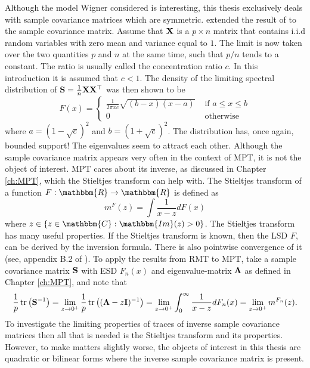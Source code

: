 \documentclass[12pt, twoside]{book}\usepackage{knitr}
\begin{document}
Although the model Wigner considered is interesting, this thesis exclusively deals with sample covariance matrices which are symmetric.
\citet{marchenko1967distribution} extended the result of \citet{wigner1967random} to the sample covariance matrix.
Assume that $\mathbf{X}$ is a $p \times n$ matrix that contains i.i.d random variables with zero mean and variance equal to $1$.
The limit is now taken over the two quantities $p$ and $n$ at the same time, such that $p/n$ tends to a constant.
The ratio is usually called the concentration ratio $c$.
In this introduction it is assumed that $c<1$.
The density of the limiting spectral distribution of $\mathbf{S}=\frac{1}{n} \mathbf{X} \mathbf{X}^\top$ was then shown to be
$$
F(x) = \begin{cases}
\frac{1}{2\pi x c} \sqrt{(b-x)(x-a)} & \text{ if } a \leq x \leq b\\
0 & \text{ otherwise}
\end{cases}
$$
where $a=(1-\sqrt{c})^2$ and $b=(1+\sqrt{c})^2$. 
The distribution has, once again, bounded support! 
The eigenvalues seem to attract each other. 
Although the sample covariance matrix appears very often in the context of MPT, it is not the object of interest. 
MPT cares about its inverse, as discussed in Chapter \ref{ch:MPT}, which the Stieltjes transform can help with. 
The Stieltjes transform of a function $F: \mathbbm{R} \rightarrow \mathbbm{R}$ is defined as 
\begin{equation}\label{eqn:stieltjes}
m^F(z) = \int \frac{1}{x-z}dF(x)
\end{equation}
where $z \in \{z \in \mathbbm{C}: \mathbbm{Im}(z)>0 \}$. 
The Stieltjes transform has many useful properties. 
If the Stieltjes transform is known, then the LSD $F$, can be derived by the inversion formula. 
There is also pointwise convergence of it (see, appendix B.2 of \citet{bai2010spectral}). 
To apply the results from RMT to MPT, take a sample covariance matrix $\mathbf{S}$ with ESD $F_n(x)$ and eigenvalue-matrix $\boldsymbol{\Lambda}$ as defined in Chapter \ref{ch:MPT}, and note that
\begin{equation}
\frac{1}{p}\operatorname{tr} \left( \mathbf{S}^{-1} \right) = \lim_{z\rightarrow 0^+} \frac{1}{p} \operatorname{tr} \left( (\boldsymbol{\Lambda} -z\mathbf{I})^{-1} \right) = \lim_{z\rightarrow 0^+} \int_0^\infty \frac{1}{x - z} dF_n(x) = \lim_{z\rightarrow 0^+} m^{F_n}(z).
\end{equation}
To investigate the limiting properties of traces of inverse sample covariance matrices then all that is needed is the Stieltjes transform and its properties. 
However, to make matters slightly worse, the objects of interest in this thesis are quadratic or bilinear forms where the inverse sample covariance matrix is present. 
\end{document}
